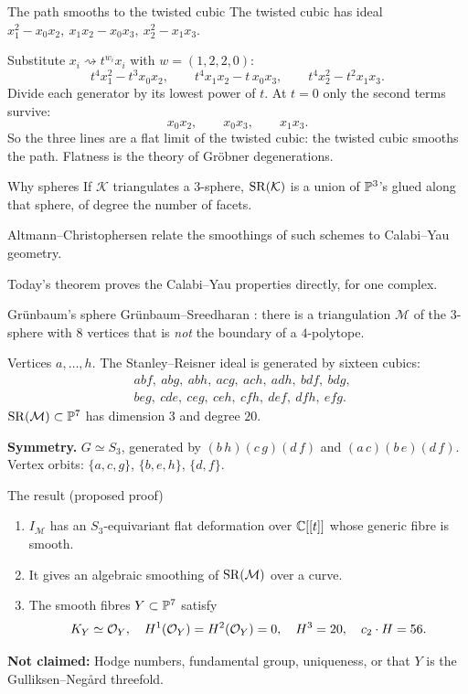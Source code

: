 \begin{frame}{The path smooths to the twisted cubic}
The twisted cubic has ideal \(x_1^2-x_0x_2,\ x_1x_2-x_0x_3,\ x_2^2-x_1x_3\).
\par\medskip
Substitute \(x_i\rightsquigarrow t^{w_i}x_i\) with \(w=(1,2,2,0)\):
\[
t^4x_1^2-t^3x_0x_2,\qquad t^4x_1x_2-t\,x_0x_3,\qquad t^4x_2^2-t^2x_1x_3.
\]
Divide each generator by its lowest power of \(t\). At \(t=0\) only the second terms survive:
\[
\boxed{x_0x_2,\qquad x_0x_3,\qquad x_1x_3.}
\]
So the three lines are a flat limit of the twisted cubic: the twisted cubic smooths the path. Flatness is the theory of Gröbner degenerations.
\end{frame}

\begin{frame}{Why spheres}
If \(\mathcal K\) triangulates a \(3\)-sphere, \(\operatorname{SR}(\mathcal K)\) is a union of \(\mathbb P^3\)'s glued along that sphere, of degree the number of facets.
\par\medskip
Altmann--Christophersen \cite{AC} relate the smoothings of such schemes to Calabi--Yau geometry.
\par\medskip
Today's theorem proves the Calabi--Yau properties directly, for one complex.
\end{frame}

\begin{frame}{Grünbaum's sphere}
Grünbaum--Sreedharan \cite{GS}: there is a triangulation \(\mathcal M\) of the \(3\)-sphere with \(8\) vertices that is \emph{not} the boundary of a \(4\)-polytope.
\par\medskip
Vertices \(a,\dots,h\). The Stanley--Reisner ideal is generated by sixteen cubics:
\[
\boxed{\begin{aligned}
&abf,\ abg,\ abh,\ acg,\ ach,\ adh,\ bdf,\ bdg,\\
&beg,\ cde,\ ceg,\ ceh,\ cfh,\ def,\ dfh,\ efg.
\end{aligned}}
\]
\(\operatorname{SR}(\mathcal M)\subset\mathbb P^7\) has dimension \(3\) and degree \(20\).
\par\medskip
\textbf{Symmetry.} \(G\simeq S_3\), generated by \((b\,h)(c\,g)(d\,f)\) and \((a\,c)(b\,e)(d\,f)\). Vertex orbits: \(\{a,c,g\}\), \(\{b,e,h\}\), \(\{d,f\}\).
\end{frame}

\begin{frame}{The result (proposed proof)}
\begin{theorem}[proposed]
\begin{enumerate}
\item \(I_{\mathcal M}\) has an \(S_3\)-equivariant flat deformation over \(\mathbb C[[t]]\) whose generic fibre is smooth.
\item It gives an algebraic smoothing of \(\operatorname{SR}(\mathcal M)\) over a curve.
\item The smooth fibres \(Y\subset\mathbb P^7\) satisfy
\[
K_Y\simeq\mathcal O_Y,\quad H^1(\mathcal O_Y)=H^2(\mathcal O_Y)=0,\quad H^3=20,\quad c_2\cdot H=56.
\]
\end{enumerate}
\end{theorem}
\textbf{Not claimed:} Hodge numbers, fundamental group, uniqueness, or that \(Y\) is the Gulliksen--Negård threefold.
\end{frame}

